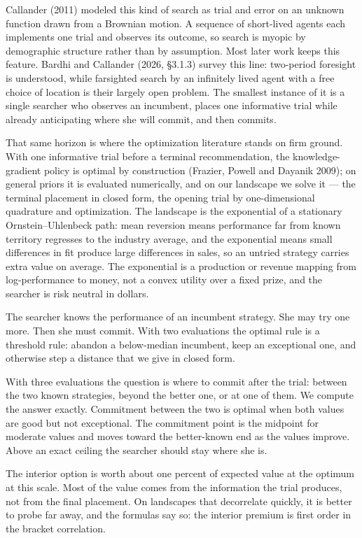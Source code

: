 \documentclass[11pt]{article}
\theoremstyle{itheads}
\begin{document}
Callander (2011) modeled this kind of search as trial and error on
an unknown function drawn from a Brownian motion. A sequence of
short-lived agents each implements one trial and observes its
outcome, so search is myopic by demographic structure rather than by
assumption. Most later work keeps this feature. Bardhi and Callander
(2026, \S3.1.3) survey this line: two-period foresight is understood,
while farsighted search by an infinitely lived agent with a free choice
of location is their largely open problem. The
smallest instance of it is a single searcher who observes an
incumbent, places one informative trial while already anticipating
where she will commit, and then commits.

That same horizon is where the optimization literature stands on
firm ground. With one informative trial before a terminal
recommendation, the knowledge-gradient policy is optimal by
construction (Frazier, Powell and Dayanik 2009); on general priors it
is evaluated numerically, and on our landscape we solve it --- the
terminal placement in closed form, the opening trial by
one-dimensional quadrature and optimization. The landscape is the exponential of a stationary
Ornstein--Uhlenbeck path: mean reversion means performance far from
known territory regresses to the industry average, and the exponential
means small differences in fit produce large differences in sales, so
an untried strategy carries extra value on average. The exponential is
a production or revenue mapping from log-performance to money, not a
convex utility over a fixed prize, and the searcher is risk neutral in
dollars.

The searcher knows the performance of an incumbent strategy. She may
try one more. Then she must commit. With two evaluations the optimal
rule is a threshold rule: abandon a below-median incumbent, keep an
exceptional one, and otherwise step a distance that we give in
closed form.

With three evaluations the question is where to commit
after the trial: between the two known strategies, beyond the better
one, or at one of them. We compute the answer exactly. Commitment
between the two is optimal when both values are good but not
exceptional. The commitment point is the midpoint for moderate
values and moves toward the better-known end as the values improve.
Above an exact ceiling the searcher should stay where she is.

The interior option is worth about one percent of expected value at
the optimum at this scale. Most of the value comes from the
information the trial produces, not from the final placement. On
landscapes that
decorrelate quickly, it is better to probe far away, and the
formulas say so: the interior premium is first order in the bracket
correlation.
\end{document}
